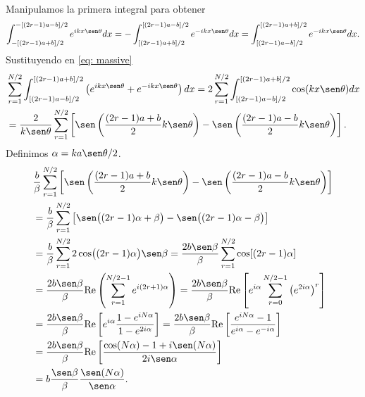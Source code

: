 Manipulamos la primera integral para obtener
\begin{equation}
	\int_{-[(2r-1)a + b]/2}^{-[(2r-1)a - b]/2} \eto{ik x \sen \theta} dx 
	= -\int_{[(2r-1)a + b]/2}^{[(2r-1)a - b]/2} \eto{-ik x \sen \theta} dx
	= \int_{[(2r-1)a - b]/2}^{[(2r-1)a + b]/2} \eto{-ik x \sen \theta} dx.
\end{equation}
Sustituyendo en \eqref{eq: massive}
\begin{equation}
	\begin{split}
	&\sum_{r=1}^{N/2}   \int_{[(2r-1)a - b]/2}^{[(2r-1)a + b]/2} \left(
	\eto{ik x \sen \theta}  +  \eto{-ik x \sen \theta}
	\right) dx
	= 2\sum_{r=1}^{N/2}   \int_{[(2r-1)a - b]/2}^{[(2r-1)a + b]/2} 
	\cos(k x \sen \theta)dx\\
	&=\frac{2}{k\sen \theta}\sum_{r=1}^{N/2}\left [ \sen\left( \frac{(2r-1)a + b}{2}k\sen \theta \right) - \sen\left( \frac{(2r-1)a - b}{2}k\sen \theta \right)
	\right].
	\end{split}
\end{equation}
Definimos $\alpha = ka \sen \theta /2$.
\begin{equation}
	\begin{split}
		&\frac{b}{\beta}\sum_{r=1}^{N/2}\left [ \sen\left( \frac{(2r-1)a + b}{2}k\sen \theta \right) - \sen\left( \frac{(2r-1)a - b}{2}k\sen \theta \right)
	\right]\\
	&= \frac{b}{\beta}\sum_{r=1}^{N/2}\left [ \sen \bigl( (2r-1)\alpha + \beta \bigr) -  \sen \bigl( (2r-1)\alpha - \beta \bigr)
	\right]\\
	&= \frac{b}{\beta} \sum_{r=1}^{N/2} 2 \cos\bigl((2r-1)\alpha \bigr) \sen \beta
	= \frac{2b\sen \beta}{\beta} \sum_{r=1}^{N/2} \cos [(2r-1)\alpha ]\\
	&= \frac{2b\sen \beta}{\beta} \Re\left( \sum_{r=1}^{N/2 - 1} \eto{i(2r+1)\alpha } \right)
	=  \frac{2b\sen \beta}{\beta} \Re \left[  \eto{i\alpha} \sum_{r=0}^{N/2 - 1} \left(\eto{2i \alpha} \right)^r \right]\\
	&= \frac{2b\sen \beta}{\beta} \Re \left[ \eto{i\alpha}\frac{1 - \eto{iN\alpha}}{1 - \eto{2i\alpha}} \right]
	= \frac{2b\sen \beta}{\beta} \Re \left[\frac{\eto{iN\alpha} - 1}{\eto{i\alpha} - \eto{-i\alpha}} \right]\\
	&= \frac{2b\sen \beta}{\beta} \Re \left[\frac{\cos(N\alpha) - 1 + i \sen(N\alpha)}{2i \sen \alpha} \right]\\
	&=  b\frac{\sen \beta}{\beta} \frac{\sen (N\alpha)}{\sen \alpha}.
	\end{split}
\end{equation}
